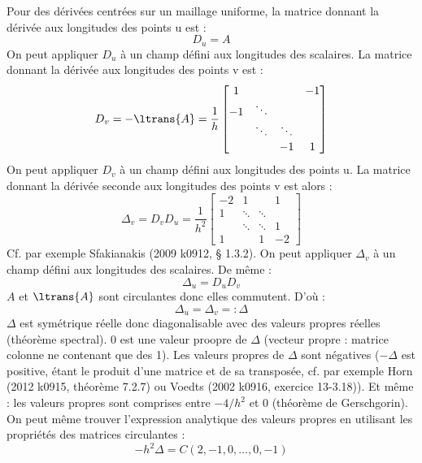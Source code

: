 \documentclass[a4paper,english,french]{article}
\begin{document}
Pour des dérivées centrées sur un maillage uniforme, la matrice
donnant la dérivée aux longitudes des points u est :
\begin{equation*}
  D_u = A
\end{equation*}
On peut appliquer $D_u$ à un champ défini aux longitudes des
scalaires. La matrice donnant la dérivée aux longitudes des points v
est :
\begin{equation*}
  D_v = - \ltrans{A} = \frac{1}{h}
  \begin{bmatrix}
    1 & & & - 1 \\
    - 1 & \ddots \\
    & \ddots & \ddots \\
    & & - 1 & 1
  \end{bmatrix}
\end{equation*}
On peut appliquer $D_v$ à un champ défini aux longitudes des points
u. La matrice donnant la dérivée seconde aux longitudes des points v
est alors :
\begin{equation*}
  \Delta_v = D_v D_u = \frac{1}{h^2}
  \begin{bmatrix}
    - 2 & 1 & & 1 \\
    1 & \ddots & \ddots \\
    & \ddots & \ddots & 1 \\
    1 & & 1 & - 2
  \end{bmatrix}
\end{equation*}
Cf. par exemple Sfakianakis (2009 k0912, § 1.3.2). On peut appliquer
$\Delta_v$ à un champ défini aux longitudes des scalaires. De même :
\begin{equation*}
  \Delta_u = D_u D_v
\end{equation*}
$A$ et $\ltrans{A}$ sont circulantes donc elles commutent. D'où :
\begin{equation*}
  \Delta_u = \Delta_v =: \Delta
\end{equation*}
$\Delta$ est symétrique réelle donc diagonalisable avec des valeurs
propres réelles (théorème spectral). 0 est une valeur proopre de
$\Delta$ (vecteur propre : matrice colonne ne contenant que des
1). Les valeurs propres de $\Delta$ sont négatives ($- \Delta$ est
positive, étant le produit d'une matrice et de sa transposée, cf. par
exemple Horn (2012 k0915, théorème 7.2.7) ou Voedts (2002 k0916, exercice
13-3.18)). Et même : les valeurs propres sont comprises entre $- 4 /
h^2$ et 0 (théorème de Gerschgorin). On peut même trouver l'expression
analytique des valeurs propres en utilisant les propriétés des
matrices circulantes :
\begin{equation*}
  - h^2 \Delta = C(2, -1, 0, \dots, 0, - 1)
\end{equation*}
\end{document}
